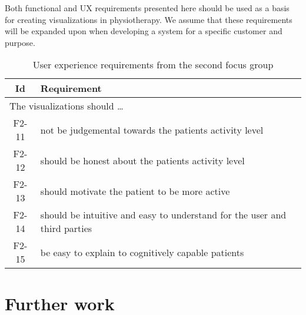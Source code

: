 Both functional and UX requirements presented here should be used as a basis for creating visualizations in physiotherapy. We assume that these requirements will be expanded upon when developing a system for a specific customer and purpose.

\begin{table}[h!]
  \begin{center}
  \begin{tabular}{|c|p{12cm}|}
    \hline
      \textbf{Id} & \textbf{Requirement} \\ \hline
    \multicolumn{2}{|l|}{The visualizations should \ldots} \\ \hline
      F2-11 & not be judgemental towards the patients activity level \\ \hline
      F2-12 & should be honest about the patients activity level \\ \hline
      F2-13 & should motivate the patient to be more active \\ \hline
      F2-14 & should be intuitive and easy to understand for the user and third parties \\ \hline
      F2-15 & be easy to explain to cognitively capable patients \\ \hline
  \end{tabular}
  \end{center}
  \caption{User experience requirements from the second focus group}
  \label{tab:f2ReqUxCon}
\end{table}

\section{Further work}


